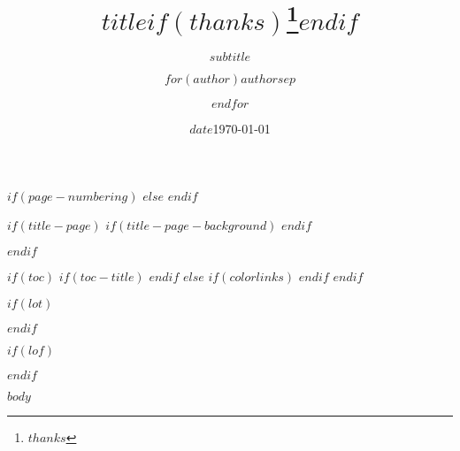 \documentclass[
$if(page-size)$
  paper=$page-size$,
$else$
  paper=a4,
$endif$
$if(fontsize)$
  fontsize=$font-size$pt,
$else$
  fontsize=10pt,
$endif$
$if(lang)$
  $babel-lang$,
$endif$
$if(draft)$
  draft=true,
$endif$
  parskip=half
]{scrartcl}
\title{$title$$if(thanks)$\thanks{$thanks$}$endif$}
\subtitle{$subtitle$}
\author{$for(author)$$author$$sep$ \and $endfor$}
\date{$date$}
\date{\today}
\begin{document}
$if(page-numbering)$
$else$
$endif$

$if(title-page)$
  $if(title-page-background)$
  $endif$
  \maketitle
  \pagebreak
$endif$

$if(toc)$
  $if(toc-title)$
    \renewcommand*\contentsname{$toc-title$}
  $endif$
$else$
{
  $if(colorlinks)$
    \hypersetup{linkcolor=$if(toccolor)$$toccolor$$else$$endif$}
  $endif$
  \setcounter{tocdepth}{$toc-depth$}
  \tableofcontents
  }
  \pagebreak
$endif$


$if(lot)$
\listoftables
$endif$

$if(lof)$
\listoffigures
$endif$

$body$
\end{document}
